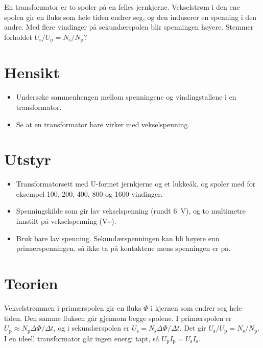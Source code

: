 \documentclass[11pt]{article}
\begin{document}

En transformator er to spoler på en felles jernkjerne. Vekselstrøm i den ene spolen gir en fluks som hele tiden endrer seg, og den induserer en spenning i den andre. Med flere vindinger på sekundærspolen blir spenningen høyere. Stemmer forholdet $U_{\mathrm{s}}/U_{\mathrm{p}} = N_{\mathrm{s}}/N_{\mathrm{p}}$?

\section*{Hensikt}

\begin{itemize}
\item Undersøke sammenhengen mellom spenningene og vindingstallene i en transformator.
\item Se at en transformator bare virker med vekselspenning.
\end{itemize}

\section*{Utstyr}

\begin{itemize}
\item Transformatorsett med U-formet jernkjerne og et lukkeåk, og spoler med for eksempel 100, 200, 400, 800 og 1600 vindinger.
\item Spenningskilde som gir lav vekselspenning (rundt 6~V), og to multimetre innstilt på vekselspenning (V\textasciitilde{}).
\item Bruk bare lav spenning. Sekundærspenningen kan bli høyere enn primærspenningen, så ikke ta på kontaktene mens spenningen er på.
\end{itemize}

\section*{Teorien}

Vekselstrømmen i primærspolen gir en fluks $Φ$ i kjernen som endrer seg hele tiden. Den samme fluksen går gjennom begge spolene. I primærspolen er $U_{\mathrm{p}} \approx N_{\mathrm{p}}ΔΦ/Δt$, og i sekundærspolen er $U_{\mathrm{s}} = N_{\mathrm{s}}ΔΦ/Δt$. Det gir $U_{\mathrm{s}}/U_{\mathrm{p}} = N_{\mathrm{s}}/N_{\mathrm{p}}$. I en ideell transformator går ingen energi tapt, så $U_{\mathrm{p}}I_{\mathrm{p}} = U_{\mathrm{s}}I_{\mathrm{s}}$.
\end{document}

